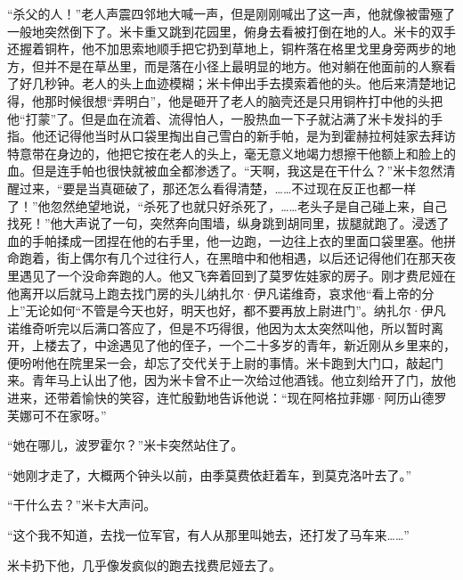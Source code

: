 \par “杀父的人！”老人声震四邻地大喊一声，但是刚刚喊出了这一声，他就像被雷殛了一般地突然倒下了。米卡重又跳到花园里，俯身去看被打倒在地的人。米卡的双手还握着铜杵，他不加思索地顺手把它扔到草地上，铜杵落在格里戈里身旁两步的地方，但并不是在草丛里，而是落在小径上最明显的地方。他对躺在他面前的人察看了好几秒钟。老人的头上血迹模糊；米卡伸出手去摸索着他的头。他后来清楚地记得，他那时候很想“弄明白”，他是砸开了老人的脑壳还是只用铜杵打中他的头把他“打蒙”了。但是血在流着、流得怕人，一股热血一下子就沾满了米卡发抖的手指。他还记得他当时从口袋里掏出自己雪白的新手帕，是为到霍赫拉柯娃家去拜访特意带在身边的，他把它按在老人的头上，毫无意义地竭力想擦干他额上和脸上的血。但是连手帕也很快就被血全都渗透了。“天啊，我这是在干什么？”米卡忽然清醒过来，“要是当真砸破了，那还怎么看得清楚，……不过现在反正也都一样了！”他忽然绝望地说，“杀死了也就只好杀死了，……老头子是自己碰上来，自己找死！”他大声说了一句，突然奔向围墙，纵身跳到胡同里，拔腿就跑了。浸透了血的手帕揉成一团捏在他的右手里，他一边跑，一边往上衣的里面口袋里塞。他拼命跑着，街上偶尔有几个过往行人，在黑暗中和他相遇，以后还记得他们在那天夜里遇见了一个没命奔跑的人。他又飞奔着回到了莫罗佐娃家的房子。刚才费尼娅在他离开以后就马上跑去找门房的头儿纳扎尔·伊凡诺维奇，哀求他“看上帝的分上”无论如何“不管是今天也好，明天也好，都不要再放上尉进门”。纳扎尔·伊凡诺维奇听完以后满口答应了，但是不巧得很，他因为太太突然叫他，所以暂时离开，上楼去了，中途遇见了他的侄子，一个二十多岁的青年，新近刚从乡里来的，便吩咐他在院里呆一会，却忘了交代关于上尉的事情。米卡跑到大门口，敲起门来。青年马上认出了他，因为米卡曾不止一次给过他酒钱。他立刻给开了门，放他进来，还带着愉快的笑容，连忙殷勤地告诉他说：“现在阿格拉菲娜·阿历山德罗芙娜可不在家呀。”
\par “她在哪儿，波罗霍尔？”米卡突然站住了。
\par “她刚才走了，大概两个钟头以前，由季莫费依赶着车，到莫克洛叶去了。”
\par “干什么去？”米卡大声问。
\par “这个我不知道，去找一位军官，有人从那里叫她去，还打发了马车来……”
\par 米卡扔下他，几乎像发疯似的跑去找费尼娅去了。
